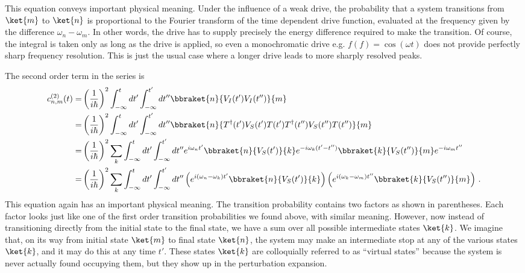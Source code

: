 This equation conveys important physical meaning.
Under the influence of a weak drive, the probability that a system transitions from $\ket{m}$ to $\ket{n}$ is proportional to the Fourier transform of the time dependent drive function, evaluated at the frequency given by the difference $\omega_n - \omega_m$.
In other words, the drive has to supply precisely the energy difference required to make the transition.
Of course, the integral is taken only as long as the drive is applied, so even a monochromatic drive e.g. $f(f) = \cos(\omega t)$ does not provide perfectly sharp frequency resolution.
This is just the usual case where a longer drive leads to more sharply resolved peaks.

The second order term in the series is
\begin{align}
  c^{(2)}_{n,m}(t)
  =& \left(\frac{1}{i\hbar}\right)^2 \int_{-\infty}^t dt' \int_{-\infty}^{t'} dt'' \bbraket{n}{V_I(t')V_I(t'')}{m} \nonumber \\
  =& \left(\frac{1}{i\hbar}\right)^2 \int_{-\infty}^t dt' \int_{-\infty}^{t'} dt'' \bbraket{n}{T^{\dagger}(t')V_S(t')T(t')T^{\dagger}(t'')V_S(t'')T(t'')}{m} \nonumber \\
  =& \left(\frac{1}{i\hbar}\right)^2 \sum_{k} \int_{-\infty}^t dt' \int_{-\infty}^{t'} dt'' e^{i\omega_n t'} \bbraket{n}{V_S(t')}{k} e^{-i \omega_k (t'-t'')} \bbraket{k}{V_S(t'')}{m} e^{-i\omega_m t''} \nonumber \\
  =& \left(\frac{1}{i\hbar}\right)^2 \sum_{k} \int_{-\infty}^t dt' \int_{-\infty}^{t'} dt''
  \left( e^{i (\omega_n - \omega_k) t'} \bbraket{n}{V_S(t')}{k} \right)
  \left( e^{i (\omega_k - \omega_m) t''}\bbraket{k}{V_S(t'')}{m} \right)
  \, .
\end{align}
This equation again has an important physical meaning.
The transition probability contains two factors as shown in parentheses.
Each factor looks just like one of the first order transition probabilities we found above, with similar meaning.
However, now instead of transitioning directly from the initial state to the final state, we have a sum over all possible intermediate states $\ket{k}$.
We imagine that, on its way from initial state $\ket{m}$ to final state $\ket{n}$, the system may make an intermediate stop at any of the various states $\ket{k}$, and it may do this at any time $t'$.
These states $\ket{k}$ are colloquially referred to as ``virtual states'' because the system is never actually found occupying them, but they show up in the perturbation expansion.

